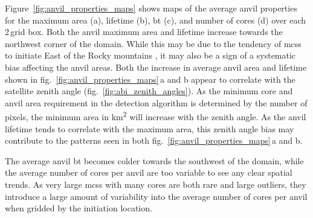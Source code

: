 Figure~\ref{fig:anvil_properties_maps} shows maps of the average anvil properties for the maximum area (a), lifetime (b), \acrshort{bt} (c), and number of cores (d) over each 2\,\textdegree grid box.
Both the anvil maximum area and lifetime increase towards the northwest corner of the domain.
While this may be due to the tendency of \acrshort{mcs}s to initiate East of the Rocky mountains \citep{feng_spatiotemporal_2019}, it may also be a sign of a systematic bias affecting the anvil areas.
Both the increase in average anvil area and lifetime shown in fig.~\ref{fig:anvil_properties_maps}\,a and b appear to correlate with the satellite zenith angle (fig.~\ref{fig:abi_zenith_angles}).
As the minimum core and anvil area requirement in the detection algorithm is determined by the number of pixels, the minimum area in \unit{km^2} will increase with the zenith angle.
As the anvil lifetime tends to correlate with the maximum area, this zenith angle bias may contribute to the patterns seen in both fig.~\ref{fig:anvil_properties_maps}\,a and b.

The average anvil \acrshort{bt} becomes colder towards the southwest of the domain, while the average number of cores per anvil are too variable to see any clear spatial trends.
As very large \acrshort{mcs}s with many cores are both rare and large outliers, they introduce a large amount of variability into the average number of cores per anvil when gridded by the initiation location.

